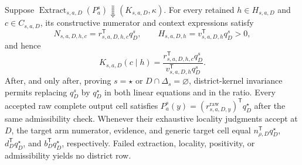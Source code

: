 Suppose \(\operatorname{Extract}_{s,a,D}(P_a^s)\Downarrow(K_{s,a,D},\kappa)\).  For every retained \(h\in H_{s,a,D}\) and \(c\in C_{s,a,D}\), its constructive numerator and context expressions satisfy
\[
N_{s,a,D,h,c}=r_{s,a,D,h,c}^{\mathsf T}q_D^s,
\qquad
H_{s,a,D,h}=v_{s,a,D,h}^{\mathsf T}q_D^s>0,
\]
and hence
\[
K_{s,a,D}(c\mid h)=
\frac{r_{s,a,D,h,c}^{\mathsf T}q_D^s}
{v_{s,a,D,h}^{\mathsf T}q_D^s}.
\]
After, and only after, proving \(s=\star\) or \(D\cap\Delta_s=\varnothing\), district-kernel invariance permits replacing \(q_D^s\) by \(q_D^\star\) in both linear equations and in the ratio.  Every accepted raw complete output cell satisfies \(P_a^s(y)=(r^{\mathrm{raw}}_{s,a,D,y})^{\mathsf T}q_D^\star\) after the same admissibility check.  Whenever their exhaustive locality judgments accept at \(D\), the target arm numerator, evidence, and generic target cell equal \(n_{\rho,D}^{\mathsf T}q_D^\star\), \(d_D^{\mathsf T}q_D^\star\), and \(b_D^{\mathsf T}q_D^\star\), respectively.  Failed extraction, locality, positivity, or admissibility yields no district row.
